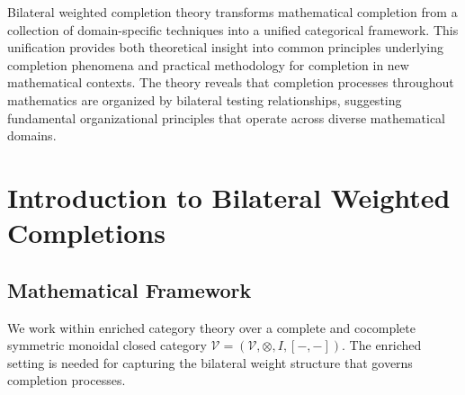 \documentclass[11pt]{article}
\theoremstyle{plain}
\theoremstyle{definition}
\theoremstyle{remark}
\newcommand{\V}{\mathcal{V}}
\newcommand{\tensor}{\otimes}
\begin{document}
Bilateral weighted completion theory transforms mathematical completion from a collection of domain-specific techniques into a unified categorical framework. This unification provides both theoretical insight into common principles underlying completion phenomena and practical methodology for completion in new mathematical contexts. The theory reveals that completion processes throughout mathematics are organized by bilateral testing relationships, suggesting fundamental organizational principles that operate across diverse mathematical domains.

\section{Introduction to Bilateral Weighted Completions}

\subsection{Mathematical Framework}

We work within enriched category theory over a complete and cocomplete symmetric monoidal closed category $\V = (\V, \tensor, I, [-,-])$. The enriched setting is needed for capturing the bilateral weight structure that governs completion processes.
\end{document}
